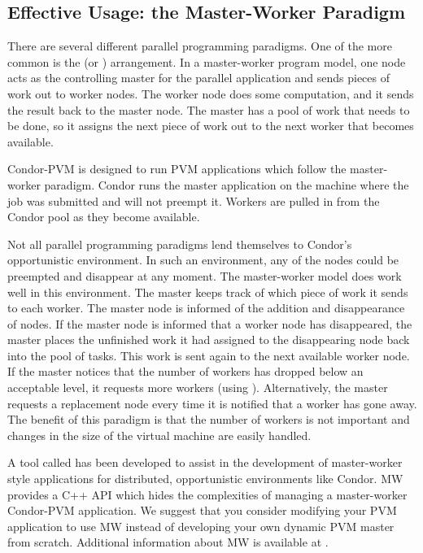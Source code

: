 \subsection{Effective Usage: the Master-Worker Paradigm}

There are several different parallel programming paradigms.  One of the
more common is the  (or )
arrangement.  In a master-worker program model, one node acts as the
controlling master for the parallel application and sends pieces
of work out to worker nodes.
The worker node does some computation, and it sends the result back to the
master node.  The master has a pool of work that needs to be
done, so it assigns the next piece of work out to the next worker
that becomes available.  

Condor-PVM is designed to run PVM applications which follow the
master-worker paradigm.  Condor runs the master application on the
machine where the job was submitted and will not preempt it.  Workers
are pulled in from the Condor pool as they become available.

Not all parallel programming paradigms lend themselves to Condor's
opportunistic environment. In such an environment, any of the nodes
could be preempted and disappear at any moment.
The master-worker model does work well in this environment.
The master keeps track of which piece of work it
sends to each worker. The master node is informed of
the addition and disappearance of nodes.
If the master node is informed that a worker node
has disappeared, the master places the unfinished work it had assigned
to the disappearing node
back into the pool of tasks.
This work is sent again to the next
available worker node.
If the master notices that the number of workers has
dropped below an acceptable level, it requests more workers
(using ).
Alternatively, the master requests
a replacement node every time it is notified that a worker has
gone away. The benefit of this paradigm is that the number of workers is
not important and changes in the size of
the virtual machine are easily handled.

A tool called  has been developed to assist in the
development of master-worker style applications for
distributed, opportunistic environments like Condor.
MW provides a C++ API which hides the complexities of managing a
master-worker Condor-PVM application.
We suggest that you consider modifying your PVM application to use MW
instead of developing your own dynamic PVM master from scratch.
Additional information about MW is available at 
.

